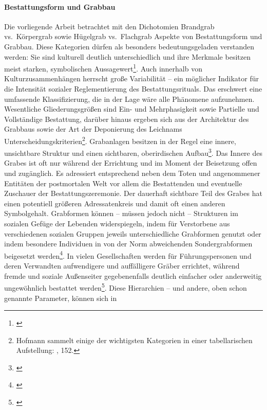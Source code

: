 \documentclass[openany,twoside,twocolumn]{book}
\let\rmarkdownfootnote\footnote%
\def\footnote{\protect\rmarkdownfootnote}
\begin{document}
\hypertarget{bestattungsform-und-grabbau}{%
\paragraph{Bestattungsform und
Grabbau}\label{bestattungsform-und-grabbau}}

Die vorliegende Arbeit betrachtet mit den Dichotomien Brandgrab
vs.~Körpergrab sowie Hügelgrab vs.~Flachgrab Aspekte von Bestattungsform
und Grabbau. Diese Kategorien dürfen als besonders bedeutungsgeladen
verstanden werden: Sie sind kulturell deutlich unterschiedlich und ihre
Merkmale besitzen meist starken, symbolischen Aussagewert\footnote{\textcite{kaliff_grave_1998}}.
Auch innerhalb von Kulturzusammenhängen herrscht große Variabilität --
ein möglicher Indikator für die Intensität sozialer Reglementierung des
Bestattungsrituals. Das erschwert eine umfassende Klassifizierung, die
in der Lage wäre alle Phänomene aufzunehmen. Wesentliche
Gliederungsgrößen sind Ein- und Mehrphasigkeit sowie Partielle und
Vollständige Bestattung, darüber hinaus ergeben sich aus der Architektur
des Grabbaus sowie der Art der Deponierung des Leichnams
Unterscheidungskriterien\footnote{Hofmann sammelt einige der wichtigsten
  Kategorien in einer tabellarischen Aufstellung:
  \textcite{hofmann_rituelle_2008}, 152.}. Grabanlagen besitzen in der
Regel eine innere, unsichtbare Struktur und einen sichtbaren,
oberirdischen Aufbau\footnote{\textcite{skjoldebrand_variations_1995}}.
Das Innere des Grabes ist oft nur während der Errichtung und im Moment
der Beisetzung offen und zugänglich. Es adressiert entsprechend neben
dem Toten und angenommener Entitäten der postmortalen Welt vor allem die
Bestattenden und eventuelle Zuschauer der Bestattungszeremonie. Der
dauerhaft sichtbare Teil des Grabes hat einen potentiell größeren
Adressatenkreis und damit oft einen anderen Symbolgehalt. Grabformen
können -- müssen jedoch nicht -- Strukturen im sozialen Gefüge der
Lebenden widerspiegeln, indem für Verstorbene aus verschiedenen sozialen
Gruppen jeweils unterschiedliche Grabformen genutzt oder indem besondere
Individuen in von der Norm abweichenden Sondergrabformen beigesetzt
werden\footnote{\textcite{hodder_social_1980}}. In vielen Gesellschaften
werden für Führungspersonen und deren Verwandten aufwendigere und
auffälligere Gräber errichtet, während fremde und soziale Außenseiter
gegebenenfalls deutlich einfacher oder anderweitig ungewöhnlich
bestattet werden\footnote{\textcite{pauli_ungewohnliche_1978}}. Diese
Hierarchien -- und andere, oben schon genannte Parameter, können sich in
\end{document}
